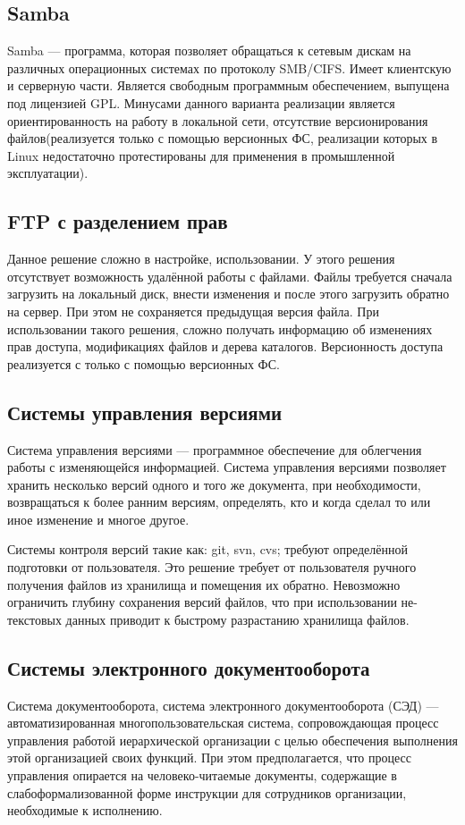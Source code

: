 \documentclass[utf8,usehyperref,12pt]{G7-32}
\begin{document}
\subsection{Samba}

Samba — программа, которая позволяет обращаться к сетевым дискам на различных операционных системах по протоколу SMB/CIFS. 
Имеет клиентскую и серверную части. Является свободным программным обеспечением, выпущена под лицензией GPL.
Минусами данного варианта реализации является ориентированность на работу в локальной сети, отсутствие версионирования файлов(реализуется только с помощью версионных ФС, реализации которых в Linux недостаточно протестированы для применения в промышленной эксплуатации).

\subsection{FTP с разделением прав}

Данное решение сложно в настройке, использовании. У этого решения отсутствует возможность 
удалённой работы с файлами. Файлы требуется сначала загрузить на локальный диск, внести 
изменения и после этого загрузить обратно на сервер. При этом не сохраняется предыдущая версия файла. При использовании такого решения, сложно получать информацию об изменениях прав доступа, модификациях файлов и дерева каталогов. Версионность доступа реализуется с только с помощью версионных ФС.

\subsection{Системы управления версиями}
Система управления версиями — программное обеспечение для облегчения работы с изменяющейся информацией. Система управления версиями позволяет хранить несколько версий одного и того же документа, при необходимости, возвращаться к более ранним версиям, определять, кто и когда сделал то или иное изменение и многое другое.

Системы контроля версий такие как: git, svn, cvs; требуют определённой подготовки от пользователя. Это решение требует от пользователя ручного получения файлов из хранилища и помещения их обратно. Невозможно ограничить глубину сохранения версий файлов, что при использовании не-текстовых данных приводит к быстрому разрастанию хранилища файлов.

\subsection{Системы электронного документооборота}
Система документооборота, система электронного документооборота (СЭД) — автоматизированная многопользовательская система, сопровождающая процесс управления работой иерархической организации с целью обеспечения выполнения этой организацией своих функций. При этом предполагается, что процесс управления опирается на человеко-читаемые документы, содержащие в слабоформализованной форме инструкции для сотрудников организации, необходимые к исполнению.
\end{document}
